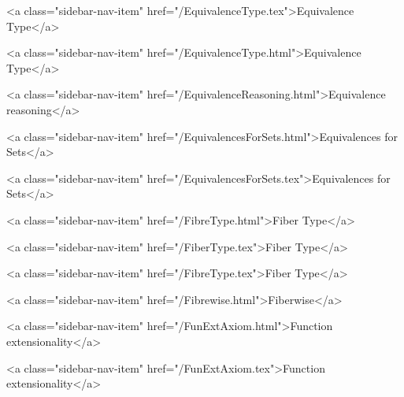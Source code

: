       
        
          <a class="sidebar-nav-item" href="/EquivalenceType.tex">Equivalence Type</a>
        
      
    
      
        
          <a class="sidebar-nav-item" href="/EquivalenceType.html">Equivalence Type</a>
        
      
    
      
        
          <a class="sidebar-nav-item" href="/EquivalenceReasoning.html">Equivalence reasoning</a>
        
      
    
      
        
          <a class="sidebar-nav-item" href="/EquivalencesForSets.html">Equivalences for Sets</a>
        
      
    
      
        
          <a class="sidebar-nav-item" href="/EquivalencesForSets.tex">Equivalences for Sets</a>
        
      
    
      
        
          <a class="sidebar-nav-item" href="/FibreType.html">Fiber Type</a>
        
      
    
      
        
          <a class="sidebar-nav-item" href="/FiberType.tex">Fiber Type</a>
        
      
    
      
        
          <a class="sidebar-nav-item" href="/FibreType.tex">Fiber Type</a>
        
      
    
      
        
          <a class="sidebar-nav-item" href="/Fibrewise.html">Fiberwise</a>
        
      
    
      
        
          <a class="sidebar-nav-item" href="/FunExtAxiom.html">Function extensionality</a>
        
      
    
      
        
          <a class="sidebar-nav-item" href="/FunExtAxiom.tex">Function extensionality</a>
        
